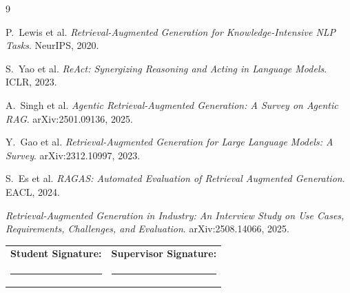 \documentclass[10pt,a4paper]{article}
\begin{document}
\begingroup
\renewcommand{\refname}{\texorpdfstring{\color{mainblue}}{}Preliminary References}
\scriptsize
\begin{thebibliography}{9}
\setlength{\itemsep}{0pt}

P.\ Lewis et al.
\textit{Retrieval-Augmented Generation for Knowledge-Intensive NLP Tasks}.
NeurIPS, 2020.

S.\ Yao et al.
\textit{ReAct: Synergizing Reasoning and Acting in Language Models}.
ICLR, 2023.

A.\ Singh et al.
\textit{Agentic Retrieval-Augmented Generation: A Survey on Agentic RAG}.
arXiv:2501.09136, 2025.

Y.\ Gao et al.
\textit{Retrieval-Augmented Generation for Large Language Models: A Survey}.
arXiv:2312.10997, 2023.

S.\ Es et al.
\textit{RAGAS: Automated Evaluation of Retrieval Augmented Generation}.
EACL, 2024.

\textit{Retrieval-Augmented Generation in Industry: An Interview Study on Use Cases, Requirements, Challenges, and Evaluation}.
arXiv:2508.14066, 2025.

\end{thebibliography}
\endgroup

\vspace{0.1em}

\noindent
\begin{tabularx}{\textwidth}{X X}
\textbf{Student Signature:} & \textbf{Supervisor Signature:} \\[0.9em]
\rule{0.42\textwidth}{0.4pt} & \rule{0.42\textwidth}{0.4pt} \\
\end{tabularx}
\end{document}
